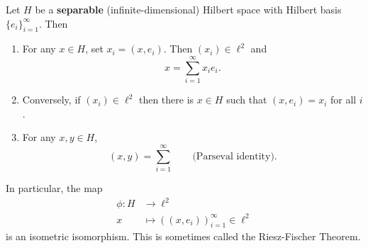 \documentclass{article}
\begin{document}
\begin{prop}
    Let $H$ be a \textbf{separable} (infinite-dimensional) Hilbert space with Hilbert basis $\{e_i\}_{i=1}^\infty$. Then
    \begin{enumerate}[label=(\roman*)]
        \item For any $x \in H$, set $x_i = (x, e_i)$. Then $(x_i) \in \ell^2$ and
            \begin{equation*}
                x = \sum_{i=1}^\infty x_i e_i.
            \end{equation*}
        \item Conversely, if $(x_i) \in \ell^2$ then there is $x \in H$ such that $(x, e_i) = x_i$ for all $i$.
        \item For any $x, y \in H$,
            \begin{equation*}
                (x, y) = \sum_{i=1}^\infty \qquad \text{(Parseval identity)}.
            \end{equation*}
    \end{enumerate}
    In particular, the map
    \begin{align*}
        \phi: H &\longrightarrow \ell^2 \\
        x &\longmapsto ((x, e_i))_{i=1}^\infty \in \ell^2
    \end{align*}
    is an isometric isomorphism. This is sometimes called the Riesz-Fischer Theorem.
\end{prop}
\end{document}
